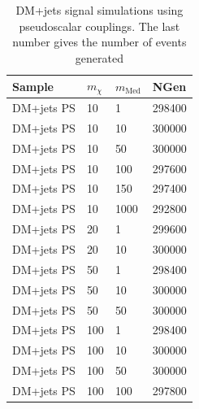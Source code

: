 \begin{table}[]
\centering
\begin{tabular}{llll}
\hline \hline
Sample & $m_\chi$    & $m_\textrm{Med}$    & NGen \\ \hline  
DM+jets PS & 10  & 1      & 298400 \\
DM+jets PS & 10  & 10     & 300000 \\
DM+jets PS & 10  & 50     & 300000 \\
DM+jets PS & 10  & 100    & 297600 \\
DM+jets PS & 10  & 150    & 297400 \\
DM+jets PS & 10  & 1000   & 292800 \\
DM+jets PS & 20  & 1      & 299600 \\
DM+jets PS & 20  & 10     & 300000 \\
DM+jets PS & 50  & 1      & 298400 \\
DM+jets PS & 50  & 10     & 300000 \\
DM+jets PS & 50  & 50     & 300000 \\
DM+jets PS & 100 & 1      & 298400 \\
DM+jets PS & 100 & 10     & 300000 \\
DM+jets PS & 100 & 50     & 300000 \\
DM+jets PS & 100 & 100    & 297800\\
\hline \hline
\end{tabular}
\caption{DM+jets signal simulations using pseudoscalar couplings. The last number gives the number of events generated}
\label{tab:dmj_ps}
\end{table}


